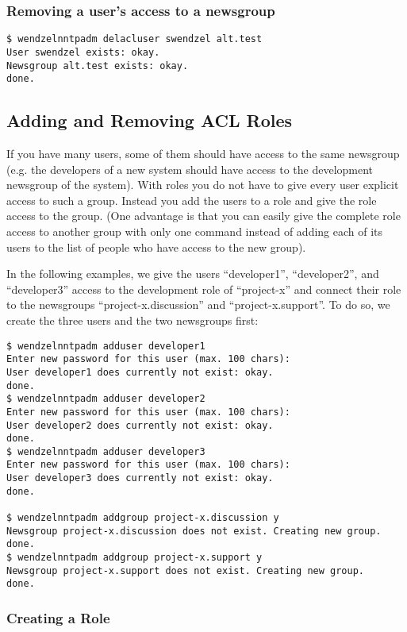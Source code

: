 \subsubsection{Removing a user's access to a newsgroup}

\begin{verbatim}
$ wendzelnntpadm delacluser swendzel alt.test
User swendzel exists: okay.
Newsgroup alt.test exists: okay.
done.
\end{verbatim}

\subsection{Adding and Removing ACL Roles}

If you have many users, some of them should have access to the same newsgroup (e.g. the developers of a new system should have access to the development newsgroup of the system). With roles you do not have to give every user explicit access to such a group. Instead you add the users to a role and give the role access to the group. (One advantage is that you can easily give the complete role access to another group with only one command instead of adding each of its users to the list of people who have access to the new group).

In the following examples, we give the users ``developer1'', ``developer2'', and ``developer3'' access to the development role of ``project-x'' and connect their role to the newsgroups ``project-x.discussion'' and ``project-x.support''. To do so, we create the three users and the two newsgroups first:

\begin{verbatim}
$ wendzelnntpadm adduser developer1
Enter new password for this user (max. 100 chars):
User developer1 does currently not exist: okay.
done.
$ wendzelnntpadm adduser developer2
Enter new password for this user (max. 100 chars):
User developer2 does currently not exist: okay.
done.
$ wendzelnntpadm adduser developer3
Enter new password for this user (max. 100 chars):
User developer3 does currently not exist: okay.
done.

$ wendzelnntpadm addgroup project-x.discussion y
Newsgroup project-x.discussion does not exist. Creating new group.
done.
$ wendzelnntpadm addgroup project-x.support y
Newsgroup project-x.support does not exist. Creating new group.
done.
\end{verbatim}

\subsubsection{Creating a Role}

